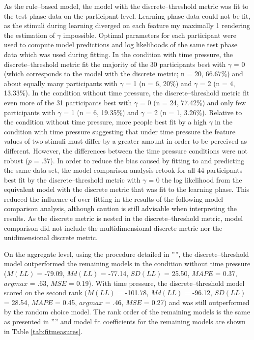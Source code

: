 \documentclass[a4paper,man,natbib]{apa6}
\begin{document}
As the rule--based model, the model with the discrete--threshold metric was fit to the test phase data on the participant level. Learning phase data could not be fit, as the stimuli during learning diverged on each feature my maximally 1 rendering the estimation of $\gamma$ impossible. Optimal parameters for each participant were used to compute model predictions and log likelihoods of the same test phase data which was used during fitting. In the condition with time pressure, the discrete--threshold metric fit the majority of the 30 participants best with $\gamma$ = 0 (which corresponds to the model with the discrete metric; n = 20, 66.67\%) and about equally many participants with $\gamma$ = 1 (n = 6, 20\%) and $\gamma$ = 2 (n = 4, 13.33\%). In the condition without time pressure, the discrete--threshold metric fit even more of the 31 participants best with $\gamma$ = 0 (n = 24, 77.42\%) and only few participants with $\gamma$ = 1 (n = 6, 19.35\%) and $\gamma$ = 2 (n = 1, 3.26\%). Relative to the condition without time pressure, more people best fit by a high $\gamma$ in the condition with time pressure suggesting that under time pressure the feature values of two stimuli must differ by a greater amount in order to be perceived as different. However, the differences between the time pressure conditions were not robust ($p$ = .37). In order to reduce the bias caused by fitting to and predicting the same data set, the model comparison analysis retook for all 44 participants best fit by the discrete--threshold metric with $\gamma$ = 0 the log likelihood from the equivalent model with the discrete metric that was fit to the learning phase. This reduced the influence of over--fitting in the results of the following model comparison analysis, although caution is still advisable when interpreting the results. As the discrete metric is nested in the discrete--threshold metric, model comparison did not include the multidimensional discrete metric nor the unidimensional discrete metric. 

On the aggregate level, using the procedure detailed in '''', the discrete--threshold model outperformed the remaining models in the condition without time pressure ($M(LL)$ = -79.09, $Md(LL)$ = -77.14, $SD(LL)$ = 25.50, $MAPE$ = 0.37, $argmax$ = .63, $MSE$ = 0.19).
With time pressure, the discrete--threshold model scored on the second rank ($M(LL)$ = -101.78, $Md(LL)$ = -96.12, $SD(LL)$ = 28.54, $MAPE$ = 0.45, $argmax$ = .46, $MSE$ = 0.27) and was still outperformed by the random choice model. The rank order of the remaining models is the same as presented in '''' and model fit coefficients for the remaining models are shown in Table \ref{tab:fitmeasures}. 
\end{document}
